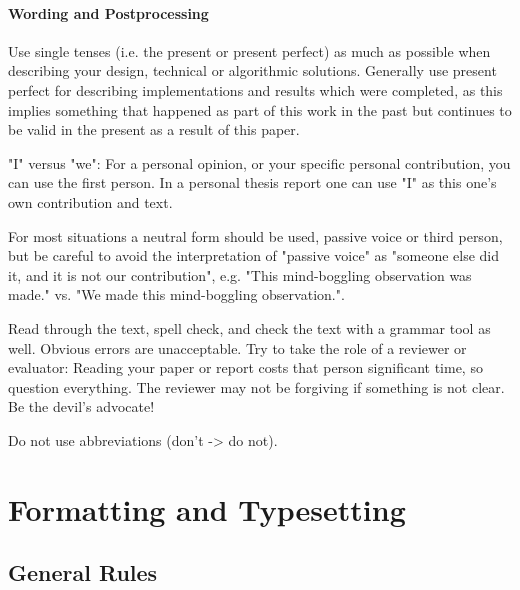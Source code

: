 \documentclass[11pt, a4paper,oneside,chapterprefix=false]{scrbook}
\begin{document}
\paragraph*{Wording and Postprocessing}

Use single tenses (i.e. the present or present perfect) as much as possible when describing your design, technical or algorithmic solutions. Generally use present perfect for describing implementations and results which were completed, as this implies something that happened as part of this work in the past but continues to be valid in the present as a result of this paper.

"I" versus "we": For a personal opinion, or your specific personal contribution, you can use the first person. In a personal thesis report one can use "I" as this one's own contribution and text.

For most situations a neutral form should be used, passive voice or third person, but be careful to avoid the interpretation of "passive voice" as "someone else did it, and it is not our contribution", e.g. "This mind-boggling observation was made." vs. "We made this mind-boggling observation.".

Read through the text, spell check, and check the text with a grammar tool as well. Obvious errors are unacceptable.
Try to take the role of a reviewer or evaluator: Reading your paper or report costs that person significant time, so question everything. The reviewer may not be forgiving if something is not clear. Be the devil's advocate!

Do not use abbreviations (don't -> do not).

\section*{Formatting and Typesetting} \label{sec:formatting}

\subsection*{General Rules}
\end{document}

